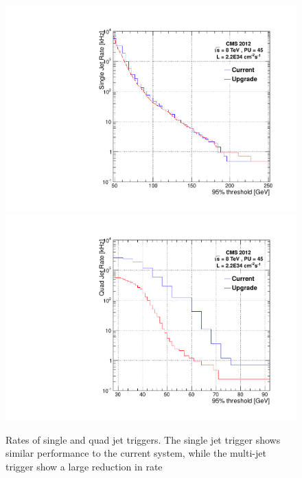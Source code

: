 \begin{figure}[t!]
\begin{center}
  \includegraphics[scale=0.3]{Figures/l1jets/singleJetRates_95thresh_2e34.pdf}
    \includegraphics[scale=0.3]{Figures/l1jets/quadJetRates_95thresh_2e34.pdf}
\caption{Rates of single and quad jet triggers. The single jet trigger shows similar performance to the current system, while the multi-jet trigger show a large reduction in rate}
\label{JetRate_95}
\end{center}
\end{figure}


